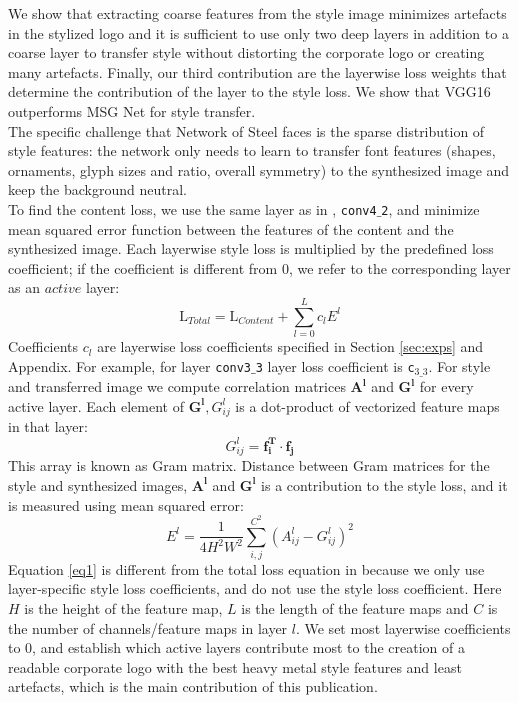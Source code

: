 \documentclass[a4paper,twoside]{article}
\begin{document}
\noindent We show that extracting coarse features from the style image minimizes artefacts in the stylized logo and it is sufficient to use only two deep layers in addition to a coarse layer to transfer style without distorting the corporate logo or creating many artefacts. Finally, our third contribution are the layerwise loss weights that determine the contribution of the layer to the style loss. We show that VGG16 outperforms MSG Net for style transfer. \\

\noindent The specific challenge that Network of Steel faces is the sparse distribution of style features: the network only needs to learn to transfer font features (shapes, ornaments, glyph sizes and ratio, overall symmetry) to the synthesized image and keep the background neutral.\\      

\noindent To find the content loss, we use the same layer as in \cite{gatys2016image}, \texttt{conv4${}\_{}$2}, and minimize mean squared error function between the features of the content and the synthesized image. Each layerwise style loss is multiplied by the predefined loss coefficient; if the coefficient is different from $0$, we refer to the corresponding layer as an $active$ layer:
\begin{equation}\label{eq1}
    \text{L}_{Total} = \text{L}_{Content} + \sum_{l=0}^{L}c_l E^l
\end{equation}
Coefficients $c_l$ are layerwise loss coefficients specified in Section \ref{sec:exps} and Appendix. For example, for layer \texttt{conv3${}\_{}$3} layer loss coefficient is \texttt{c$_{3\_3}$}. For style and transferred image we compute correlation matrices $\mathbf{A^l}$ and $\mathbf{G^l}$ for every active layer. Each element of $\mathbf{G^l}, G^{l}_{ij}$ is a dot-product of vectorized feature maps in that layer:
\begin{equation}
\label{eq2}
    G^{l}_{ij} =\mathbf{f^{T}_i} \cdot  \mathbf{f_j}
\end{equation}
This array is known as Gram matrix. Distance between Gram matrices for the style and synthesized images, $\mathbf{A^l}$ and $\mathbf{G^l}$ is a contribution to the style loss, and it is measured using mean squared error:
\begin{equation}
\label{eq3}
   E^l = \frac{1}{4 H^2 W^2} \sum_{i,j}^{C^2} (A^l_{ij} - G^l_{ij})^2
\end{equation}
Equation \ref{eq1} is different from the total loss equation in \cite{gatys2016image} because we only use layer-specific style loss coefficients, and do not use the style loss coefficient. Here $H$ is the height of the feature map, $L$ is the length of the feature maps and $C$ is the number of channels/feature maps in layer $l$. We set most layerwise coefficients to $0$, and establish which active layers contribute most to the creation of a readable corporate logo with the best heavy metal style features and least artefacts, which is the main contribution of this publication. 
\end{document}
